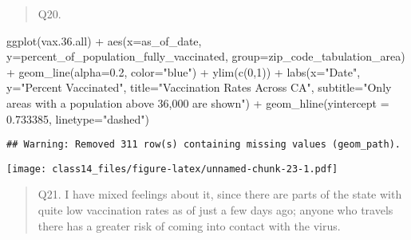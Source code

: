\documentclass[
]{article}
\newenvironment{Shaded}{\begin{snugshade}}{\end{snugshade}}
\newcommand{\AttributeTok}[1]{\textcolor[rgb]{0.77,0.63,0.00}{#1}}
\newcommand{\DecValTok}[1]{\textcolor[rgb]{0.00,0.00,0.81}{#1}}
\newcommand{\FloatTok}[1]{\textcolor[rgb]{0.00,0.00,0.81}{#1}}
\newcommand{\FunctionTok}[1]{\textcolor[rgb]{0.00,0.00,0.00}{#1}}
\newcommand{\NormalTok}[1]{#1}
\newcommand{\SpecialCharTok}[1]{\textcolor[rgb]{0.00,0.00,0.00}{#1}}
\newcommand{\StringTok}[1]{\textcolor[rgb]{0.31,0.60,0.02}{#1}}
\begin{document}
\begin{quote}
Q20.
\end{quote}

\begin{Shaded}
\begin{Highlighting}[]
\FunctionTok{ggplot}\NormalTok{(vax.}\FloatTok{36.}\NormalTok{all) }\SpecialCharTok{+}
  \FunctionTok{aes}\NormalTok{(}\AttributeTok{x=}\NormalTok{as\_of\_date, }\AttributeTok{y=}\NormalTok{percent\_of\_population\_fully\_vaccinated, }
      \AttributeTok{group=}\NormalTok{zip\_code\_tabulation\_area) }\SpecialCharTok{+}
  \FunctionTok{geom\_line}\NormalTok{(}\AttributeTok{alpha=}\FloatTok{0.2}\NormalTok{, }\AttributeTok{color=}\StringTok{"blue"}\NormalTok{) }\SpecialCharTok{+}
  \FunctionTok{ylim}\NormalTok{(}\FunctionTok{c}\NormalTok{(}\DecValTok{0}\NormalTok{,}\DecValTok{1}\NormalTok{)) }\SpecialCharTok{+}
  \FunctionTok{labs}\NormalTok{(}\AttributeTok{x=}\StringTok{"Date"}\NormalTok{, }\AttributeTok{y=}\StringTok{"Percent Vaccinated"}\NormalTok{,}
       \AttributeTok{title=}\StringTok{"Vaccination Rates Across CA"}\NormalTok{,}
       \AttributeTok{subtitle=}\StringTok{"Only areas with a population above 36,000 are shown"}\NormalTok{) }\SpecialCharTok{+}
  \FunctionTok{geom\_hline}\NormalTok{(}\AttributeTok{yintercept =} \FloatTok{0.733385}\NormalTok{, }\AttributeTok{linetype=}\StringTok{"dashed"}\NormalTok{)}
\end{Highlighting}
\end{Shaded}

\begin{verbatim}
## Warning: Removed 311 row(s) containing missing values (geom_path).
\end{verbatim}

\texttt{[image: class14\_files/figure-latex/unnamed-chunk-23-1.pdf]}

\begin{quote}
Q21. I have mixed feelings about it, since there are parts of the state
with quite low vaccination rates as of just a few days ago; anyone who
travels there has a greater risk of coming into contact with the virus.
\end{quote}
\end{document}
